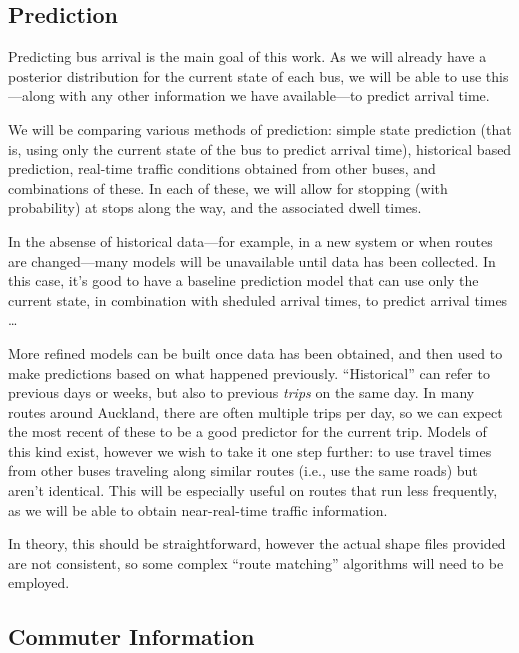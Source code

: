 \documentclass[12pt,a4paper]{article}
\begin{document}
\subsection{Prediction}
\label{sec:new-prediction}


Predicting bus arrival is the main goal of this work.
As we will already have a posterior distribution for the current state of
each bus, 
we will be able to use this---along with any other information we
have available---to predict arrival time.


We will be comparing various methods of prediction:
simple state prediction (that is, using only the current state of the 
bus to predict arrival time),
historical based prediction,
real-time traffic conditions obtained from other buses,
and combinations of these.
In each of these, we will allow for stopping (with probability) at stops
along the way, and the associated dwell times.


In the absense of historical data---for example, in a new system or when
routes are changed---many models will be unavailable until data has been collected.
In this case, it's good to have a baseline prediction model that can use 
only the current state, in combination with sheduled arrival times,
to predict arrival times \ldots


More refined models can be built once data has been obtained, 
and then used to make predictions based on what happened previously.
``Historical'' can refer to previous days or weeks,
but also to previous \emph{trips} on the same day.
In many routes around Auckland, there are often multiple trips per day,
so we can expect the most recent of these to be a good predictor for the current trip.
Models of this kind exist, however we wish to take it one step further:
to use travel times from other buses traveling along similar routes
(i.e., use the same roads) but aren't identical.
This will be especially useful on routes that run less frequently,
as we will be able to obtain near-real-time traffic information.


In theory, this should be straightforward,
however the actual shape files provided are not consistent, so some complex ``route matching''
algorithms will need to be employed.



\subsection{Commuter Information}
\label{sec:commuter-info}
\end{document}

